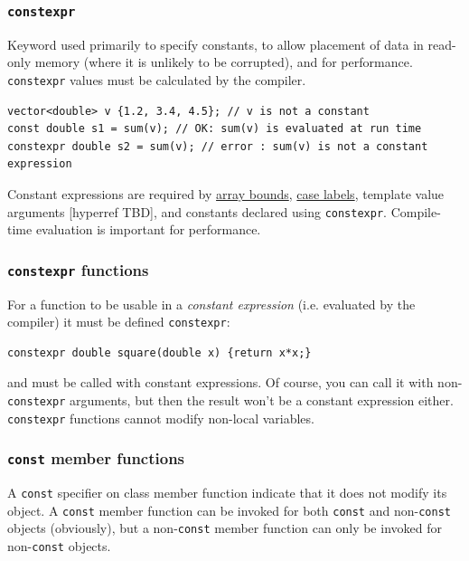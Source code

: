 \documentclass[table, xcdraw]{article}%
\begin{document}
\subsubsection{\texttt{constexpr}} \label{constexpr}
Keyword used  primarily to specify constants, to allow placement of data in read-only memory (where it is unlikely to be corrupted), and for performance. \texttt{constexpr} values must be calculated by the compiler.

\begin{verbatim}
vector<double> v {1.2, 3.4, 4.5}; // v is not a constant
const double s1 = sum(v); // OK: sum(v) is evaluated at run time
constexpr double s2 = sum(v); // error : sum(v) is not a constant expression
\end{verbatim}

Constant expressions are required by \hyperref[array]{array bounds}, \hyperref[switch]{case labels}, template value arguments [hyperref TBD], and constants declared using \texttt{constexpr}. Compile-time evaluation is important for performance.

\subsubsection{\texttt{constexpr} functions}

For a function to be usable in a \textit{constant expression} (i.e. evaluated by the compiler) it must be defined \texttt{constexpr}:

\begin{verbatim}
constexpr double square(double x) {return x*x;}
\end{verbatim}

and must be called with constant expressions. Of course, you can call it with non-\texttt{constexpr} arguments, but then the result won't be a constant expression either. \texttt{constexpr} functions cannot modify non-local variables.

\subsubsection{\texttt{const} member functions}

A \texttt{const} specifier on class member function indicate that it does not modify its object. A \texttt{const} member function can be invoked for both \texttt{const} and non-\texttt{const} objects (obviously), but a non-\texttt{const} member function can only be invoked for non-\texttt{const} objects.
\end{document}
